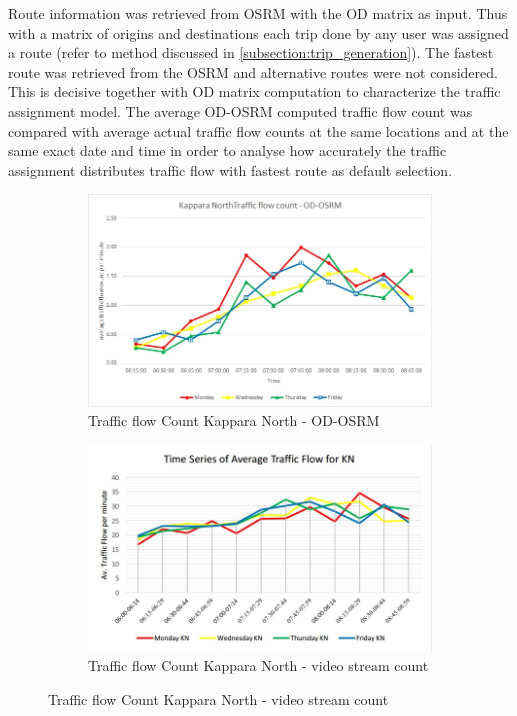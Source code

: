 \documentclass[12pt, a4paper]{report}
\theoremstyle{definition}
\theoremstyle{definition}%
\theoremstyle{definition}%
\theoremstyle{definition}%
\theoremstyle{definition}%
\theoremstyle{definition}%
\begin{document}
Route information was retrieved from OSRM with the OD matrix as input. Thus with a matrix of origins and destinations each trip done by any user was assigned a route (refer to method discussed in \ref{subsection:trip_generation}). The fastest route was retrieved from the OSRM and alternative routes were not considered. This is decisive together with OD matrix computation to characterize the traffic assignment model. The average OD-OSRM computed traffic flow count was compared with average actual traffic flow counts at the same locations and at the same exact date and time in order to analyse how accurately the traffic assignment distributes traffic flow with fastest route as default selection.


\begin{figure}[!] 
	\centering
	\begin{subfigure}{0.8\textwidth}
		\centering
		\includegraphics[width=\linewidth]{traffic_flow_count_KN_MINE.jpg} 
		\caption{\scriptsize{Traffic flow Count Kappara North - OD-OSRM}} 
		\label{fig:traffic_flow_count_KN_MINE}
	\end{subfigure}
	
	\vspace{1cm}
	\begin{subfigure}{0.8\textwidth}
		\centering
		\includegraphics[width=\linewidth]{traffic_flow_count_KN_Nigel_pace.jpg} 
		\caption{\scriptsize{Traffic flow Count Kappara North - video stream count}}
		\label{fig:traffic_flow_count_KN_NP}
	\end{subfigure}
	

\end{figure}
\end{document}
